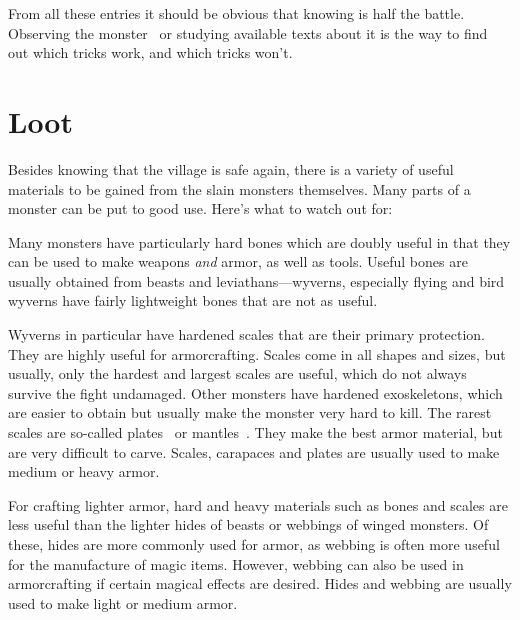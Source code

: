 From all these entries it should be obvious that knowing is half the battle. Observing the monster~ or studying available texts about it is the way to find out which tricks work, and which tricks won't.


\section{Loot}

Besides knowing that the village is safe again, there is a variety of useful materials to be gained from the slain monsters themselves. Many parts of a monster can be put to good use. Here's what to watch out for:

Many monsters have particularly hard bones which are doubly useful in that they can be used to make weapons \emph{and} armor, as well as tools. Useful bones are usually obtained from beasts and leviathans---wyverns, especially flying and bird wyverns have fairly lightweight bones that are not as useful.

Wyverns in particular have hardened scales that are their primary protection. They are highly useful for armorcrafting. Scales come in all shapes and sizes, but usually, only the hardest and largest scales are useful, which do not always survive the fight undamaged. Other monsters have hardened exoskeletons, which are easier to obtain but usually make the monster very hard to kill. The rarest scales are so-called plates~ or mantles~. They make the best armor material, but are very difficult to carve. Scales, carapaces and plates are usually used to make medium or heavy armor.

For crafting lighter armor, hard and heavy materials such as bones and scales are less useful than the lighter hides of beasts or webbings of winged monsters. Of these, hides are more commonly used for armor, as webbing is often more useful for the manufacture of magic items. However, webbing can also be used in armorcrafting if certain magical effects are desired. Hides and webbing are usually used to make light or medium armor.

